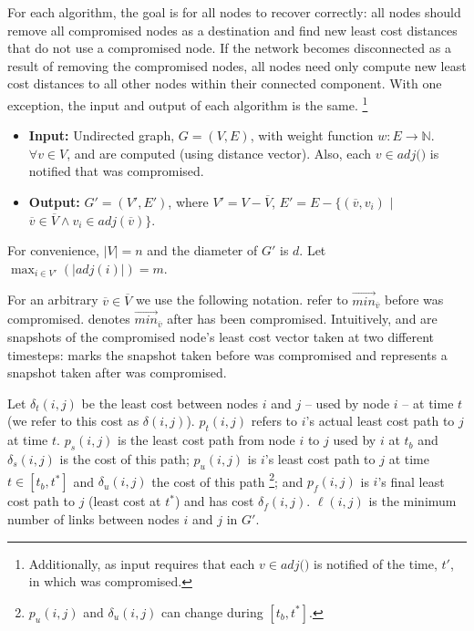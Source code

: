 For each algorithm, the goal is for all nodes to recover correctly: all nodes should remove all compromised nodes as a destination and find
new least cost distances that do not use a compromised node. If the network becomes disconnected as a result of removing the compromised nodes, all
nodes need only compute new least cost distances to all other nodes within their connected component.  With one exception, the input and output of each algorithm is the same. 
{\footnote {\small Additionally, as input \cpr requires that each $v \in adj($\bads$)$ is notified of the time, $t'$, in which \bad was compromised.}}
\begin{itemize}

	\item {\bf Input:}  Undirected graph, $G=(V,E)$, with weight function $w: E \rightarrow \mathbb{N}$.  $\forall v \in V$,  \minvv and \dmatrixv are computed
	(using distance vector). Also, each $v \in adj($\bads$)$ is notified that \bad was compromised.

	\item {\bf Output:} $G'=(V',E')$, where $V' = V - \overline{V}$, $E'=E - \{(\overline{v},v_i)$ $|$ $\overline{v} \in \overline{V} \wedge v_i \in adj(\overline{v}) \}$.
\end{itemize}
For convenience, $|V| = n$ and the diameter of $G'$ is $d$. Let $\displaystyle \max_{i \in V'}(|adj(i)|) = m$.  

For an arbitrary $\overline{v} \in \overline{V}$ we use the following notation. \oldvector refer to $\overrightarrow{min}_{\overline{v}}$ before \bad was compromised.
\badvector denotes $\overrightarrow{min}_{\overline{v}}$ after \bad has been compromised.
Intuitively, \oldvector and \badvector are snapshots of the compromised node's least cost vector taken at two different timesteps: \oldvector marks the snapshot taken before \bad was compromised and 
\badvector represents a snapshot taken after \bad was compromised.

Let $\delta_t(i,j)$ be the least cost between nodes $i$ and $j$ -- used by node $i$ --  at time $t$ (we refer to this cost as $\delta(i,j)$).
$p_t(i,j)$ refers to $i$'s actual least cost path to $j$ at time $t$.
 $p_s(i,j)$ is the least cost path from node $i$ to $j$ used by $i$ at $t_b$
and $\delta_s(i,j)$ is the cost of this path; $p_u(i,j)$ is $i$'s least cost path to $j$ at time $t \in [t_b,t^*]$ and $\delta_u(i,j)$ the cost of this path 
{\footnote {\small $p_u(i,j)$ and $\delta_u(i,j)$ can change during $[t_b,t^*]$.}}; and $p_f(i,j)$ is $i$'s final least cost path to $j$ (least cost at $t^*$)
 and has cost $\delta_f(i,j)$.  $\ell(i,j)$ is the minimum number of links between nodes $i$ and $j$ in $G'$.  


